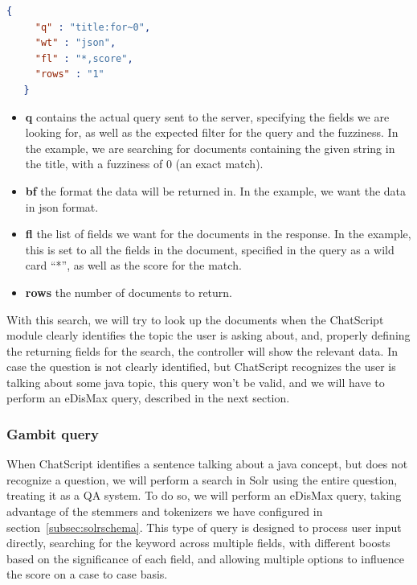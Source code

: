 \begin{center} 
  \begin{lstlisting}[language=json, caption=Example json query for Solr, label=listing:solrquery1]
   {
     "q" : "title:for~0",
     "wt" : "json",
     "fl" : "*,score",
     "rows" : "1"
   }  
  \end{lstlisting}
\end{center}

\begin{itemize}
 \item \textbf{q} contains the actual query sent to the server, specifying the fields we are looking for, as well as the expected filter for the query and the fuzziness. In the example, we are searching for documents containing the given string in the title, with a fuzziness of 0 (an exact match).
 \item \textbf{bf} the format the data will be returned in. In the example, we want the data in json format.
 \item \textbf{fl} the list of fields we want for the documents in the response. In the example, this is set to all the fields in the document, specified in the query as a wild card ``*'', as well as the score for the match.
 \item \textbf{rows} the number of documents to return.
\end{itemize}

With this search, we will try to look up the documents when the ChatScript module clearly identifies the topic the user is asking about, and, properly defining the returning fields for the search, the controller will show the relevant data. In case the question is not clearly identified, but ChatScript recognizes the user is talking about some java topic, this query won't be valid, and we will have to perform an \ac{eDisMax} query, described in the next section.

\subsubsection{Gambit query}
\label{subsec:solrgambit}

When ChatScript identifies a sentence talking about a java concept, but does not recognize a question, we will perform a search in Solr using the entire question, treating it as a \ac{QA} system. To do so, we will perform an \ac{eDisMax} query, taking advantage of the stemmers and tokenizers we have configured in section~\ref{subsec:solrschema}. This type of query is designed to process user input directly, searching for the keyword across multiple fields, with different boosts based on the significance of each field, and allowing multiple options to influence the score on a case to case basis.

